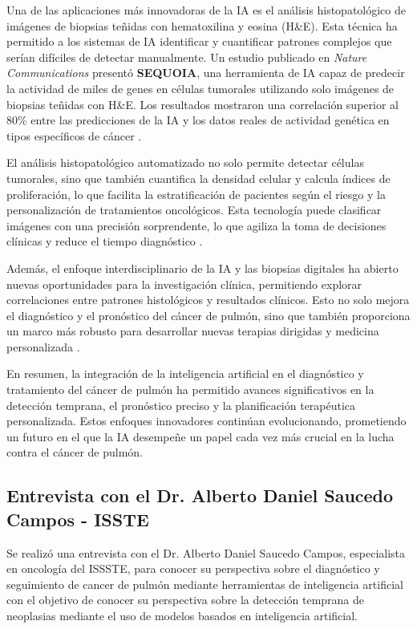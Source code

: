 Una de las aplicaciones más innovadoras de la IA es el análisis histopatológico de imágenes de biopsias teñidas con hematoxilina y eosina (H\&E). Esta técnica ha permitido a los sistemas de IA identificar y cuantificar patrones complejos que serían difíciles de detectar manualmente. Un estudio publicado en \textit{Nature Communications} presentó \textbf{SEQUOIA}, una herramienta de IA capaz de predecir la actividad de miles de genes en células tumorales utilizando solo imágenes de biopsias teñidas con H\&E. Los resultados mostraron una correlación superior al 80\% entre las predicciones de la IA y los datos reales de actividad genética en tipos específicos de cáncer \parencite{labmedica2025}.

El análisis histopatológico automatizado no solo permite detectar células tumorales, sino que también cuantifica la densidad celular y calcula índices de proliferación, lo que facilita la estratificación de pacientes según el riesgo y la personalización de tratamientos oncológicos. Esta tecnología puede clasificar imágenes con una precisión sorprendente, lo que agiliza la toma de decisiones clínicas y reduce el tiempo diagnóstico \parencite{roche2025}.

Además, el enfoque interdisciplinario de la IA y las biopsias digitales ha abierto nuevas oportunidades para la investigación clínica, permitiendo explorar correlaciones entre patrones histológicos y resultados clínicos. Esto no solo mejora el diagnóstico y el pronóstico del cáncer de pulmón, sino que también proporciona un marco más robusto para desarrollar nuevas terapias dirigidas y medicina personalizada \parencite{labmedica2025}.

En resumen, la integración de la inteligencia artificial en el diagnóstico y tratamiento del cáncer de pulmón ha permitido avances significativos en la detección temprana, el pronóstico preciso y la planificación terapéutica personalizada. Estos enfoques innovadores continúan evolucionando, prometiendo un futuro en el que la IA desempeñe un papel cada vez más crucial en la lucha contra el cáncer de pulmón.

\subsection{Entrevista con el Dr. Alberto Daniel Saucedo Campos  - ISSTE}

Se realizó una entrevista con el Dr. Alberto Daniel Saucedo Campos, especialista en oncología del ISSSTE, para conocer su perspectiva sobre el diagnóstico y seguimiento de cancer de pulmón mediante herramientas de inteligencia artificial con el objetivo de conocer su perspectiva sobre la detección temprana de neoplasias mediante el uso de modelos basados en inteligencia artificial.

